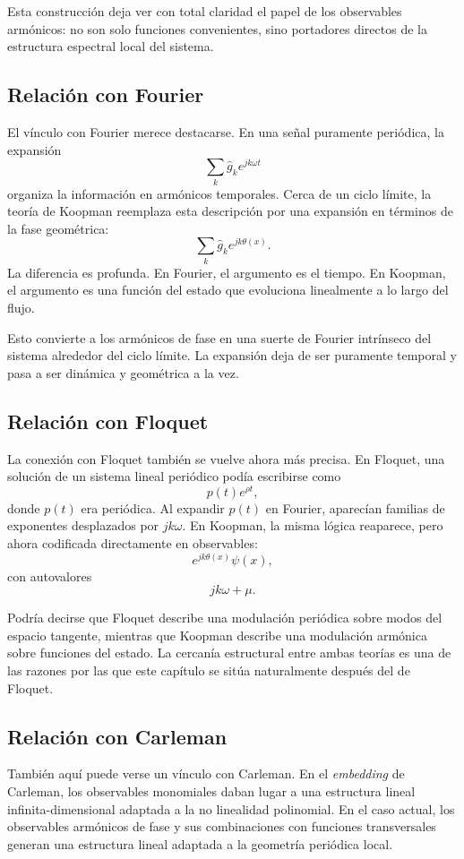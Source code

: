 Esta construcción deja ver con total claridad el papel de los observables armónicos: no son solo funciones convenientes, sino portadores directos de la estructura espectral local del sistema.

\subsection{Relación con Fourier}

El vínculo con Fourier merece destacarse. En una señal puramente periódica, la expansión
\[
\sum_k \hat{g}_k e^{jk\omega t}
\]
organiza la información en armónicos temporales. Cerca de un ciclo límite, la teoría de Koopman reemplaza esta descripción por una expansión en términos de la fase geométrica:
\[
\sum_k \hat{g}_k e^{jk\theta(x)}.
\]
La diferencia es profunda. En Fourier, el argumento es el tiempo. En Koopman, el argumento es una función del estado que evoluciona linealmente a lo largo del flujo.

Esto convierte a los armónicos de fase en una suerte de Fourier intrínseco del sistema alrededor del ciclo límite. La expansión deja de ser puramente temporal y pasa a ser dinámica y geométrica a la vez.

\subsection{Relación con Floquet}

La conexión con Floquet también se vuelve ahora más precisa. En Floquet, una solución de un sistema lineal periódico podía escribirse como
\[
p(t)e^{\rho t},
\]
donde \(p(t)\) era periódica. Al expandir \(p(t)\) en Fourier, aparecían familias de exponentes desplazados por \(jk\omega\). En Koopman, la misma lógica reaparece, pero ahora codificada directamente en observables:
\[
e^{jk\theta(x)}\psi(x),
\]
con autovalores
\[
jk\omega+\mu.
\]

Podría decirse que Floquet describe una modulación periódica sobre modos del espacio tangente, mientras que Koopman describe una modulación armónica sobre funciones del estado. La cercanía estructural entre ambas teorías es una de las razones por las que este capítulo se sitúa naturalmente después del de Floquet.

\subsection{Relación con Carleman}

También aquí puede verse un vínculo con Carleman. En el \emph{embedding} de Carleman, los observables monomiales daban lugar a una estructura lineal infinita-dimensional adaptada a la no linealidad polinomial. En el caso actual, los observables armónicos de fase y sus combinaciones con funciones transversales generan una estructura lineal adaptada a la geometría periódica local.


